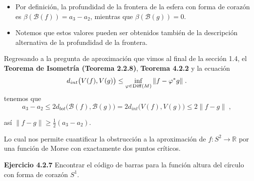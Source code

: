 \documentclass{beamer}
\newcounter{Ejercicio}
\DeclareMathOperator{\dis}{dis}
\newcommand{\calB}{{\mathcal{B}}}
\newcommand{\vphi}{\varphi}
\def\R{\mathbb{R}}
\def\Diff{{\rm Diff}}
\begin{document}
\begin{frame}{}
\begin{itemize}
    \item Por definición, la profundidad de la frontera de la esfera con forma de corazón es $\beta (\calB (f)) = a_3 - a_2$, mientras que $\beta (\calB (g)) = 0$.\pause 
    \item Notemos que estos valores pueden ser obtenidos también de la descripción alternativa de la profundidad de la frontera. 
\end{itemize}

\end{frame}

\begin{frame}{}
Regresando a la pregunta de aproximación que vimos al final de la sección 1.4, el \textbf{{\color{cyan}Teorema de Isometría (Teorema 2.2.8)}}, \textbf{{\color{cyan}Teorema 4.2.2}} y la ecuación 
\begin{equation}\label{eq: interleaving_dist_smaller_than_functions_norm}
		d_{int} \big( V(f), V(g) \big) \leq
		\inf_{\vphi \in \Diff(M)} \| f - \vphi^* g \| \;.
\end{equation}
tenemos que 
\begin{equation}
	a_3 - a_2 \leq 2 d_{bot} \big( \calB(f), \calB(g) \big) = 2 d_{int} \big( V(f), V(g) \big) \leq 2 \| f-g \| \;,
\end{equation}

así $\| f-g \| \geq \frac{1}{2} (a_3 - a_2)$.\\[0.2cm] \pause 

Lo cual nos permite cuantificar la obstrucción a la aproximación de $f: S^2 \to \R$ por una función de Morse con exactamente dos puntos críticos.\\[0.4cm] \pause
    
    
    \textbf{{\color{violet}Ejercicio 4.2.7}}	Encontrar el código de barras para la función altura del círculo con forma de corazón $S^1$.
\end{frame}
\end{document}
